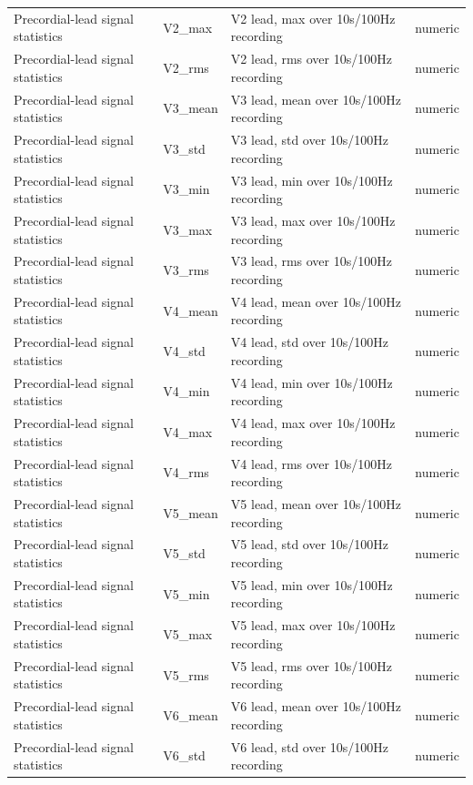 \begin{table}[htbp]
\begin{tabular}{llll}
Precordial-lead signal statistics & V2\_max & V2 lead, max over 10s/100Hz recording & numeric \\
Precordial-lead signal statistics & V2\_rms & V2 lead, rms over 10s/100Hz recording & numeric \\
Precordial-lead signal statistics & V3\_mean & V3 lead, mean over 10s/100Hz recording & numeric \\
Precordial-lead signal statistics & V3\_std & V3 lead, std over 10s/100Hz recording & numeric \\
Precordial-lead signal statistics & V3\_min & V3 lead, min over 10s/100Hz recording & numeric \\
Precordial-lead signal statistics & V3\_max & V3 lead, max over 10s/100Hz recording & numeric \\
Precordial-lead signal statistics & V3\_rms & V3 lead, rms over 10s/100Hz recording & numeric \\
Precordial-lead signal statistics & V4\_mean & V4 lead, mean over 10s/100Hz recording & numeric \\
Precordial-lead signal statistics & V4\_std & V4 lead, std over 10s/100Hz recording & numeric \\
Precordial-lead signal statistics & V4\_min & V4 lead, min over 10s/100Hz recording & numeric \\
Precordial-lead signal statistics & V4\_max & V4 lead, max over 10s/100Hz recording & numeric \\
Precordial-lead signal statistics & V4\_rms & V4 lead, rms over 10s/100Hz recording & numeric \\
Precordial-lead signal statistics & V5\_mean & V5 lead, mean over 10s/100Hz recording & numeric \\
Precordial-lead signal statistics & V5\_std & V5 lead, std over 10s/100Hz recording & numeric \\
Precordial-lead signal statistics & V5\_min & V5 lead, min over 10s/100Hz recording & numeric \\
Precordial-lead signal statistics & V5\_max & V5 lead, max over 10s/100Hz recording & numeric \\
Precordial-lead signal statistics & V5\_rms & V5 lead, rms over 10s/100Hz recording & numeric \\
Precordial-lead signal statistics & V6\_mean & V6 lead, mean over 10s/100Hz recording & numeric \\
Precordial-lead signal statistics & V6\_std & V6 lead, std over 10s/100Hz recording & numeric \\

\end{tabular}
\end{table}
